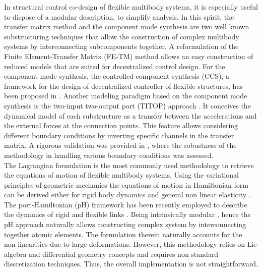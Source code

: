 In structural control co-design of flexible multibody systems, it is especially useful to dispose of a modular description, to simplify analysis. In this spirit, the transfer matrix method \cite{rong2010transfer} and the component mode synthesis \cite{hurty1965cms} are two well known substructuring techniques that allow the construction of complex multibody systems by interconnecting subcomponents together. A reformulation of the Finite Element-Transfer Matrix (FE-TM) method \cite{tan1990transfer} allows an easy construction of reduced models that are suited for decentralized control design. For the component mode synthesis, the controlled component synthesis (CCS), a framework for the design of decentralized controller of flexible structures, has been proposed in \cite{young1990}. Another modeling paradigm based on the component mode synthesis is the two-input two-output port (TITOP) approach \cite{alazard2015titop}. It conceives the dynamical model of each substructure as a transfer between the accelerations and the external forces at the connection points. This feature allows considering different boundary conditions by inverting specific channels in the transfer matrix. A rigorous validation was provided in \cite{perez2016flexible,sanfedino2018finite}, where the robustness of the methodology in handling various boundary conditions was assessed. \\

The Lagrangian formulation is the most commonly used methodology to retrieve the equations of motion of flexible multibody systems. Using the variational principles of geometric mechanics the equations of motion in Hamiltonian form can be derived either for rigid body dynamics \cite[Proposition 7.1.1]{holm2008geometric} and general non linear elasticity \cite[Chapter 3]{marsden1981lectures}. The port-Hamiltonian (pH) framework \cite{duindam2009} has been recently employed to describe the dynamics of rigid and flexible links \cite{macchelli2007link,macchelli2009multi}. Being intrinsically modular , hence the pH approach naturally allows constructing complex system by interconnecting together atomic elements. The formulation therein naturally accounts for the non-linearities due to large deformations.  However, this methodology relies on Lie algebra and differential geometry concepts and requires non standard discretization techniques. Thus, the overall implementation is not straightforward. \\

